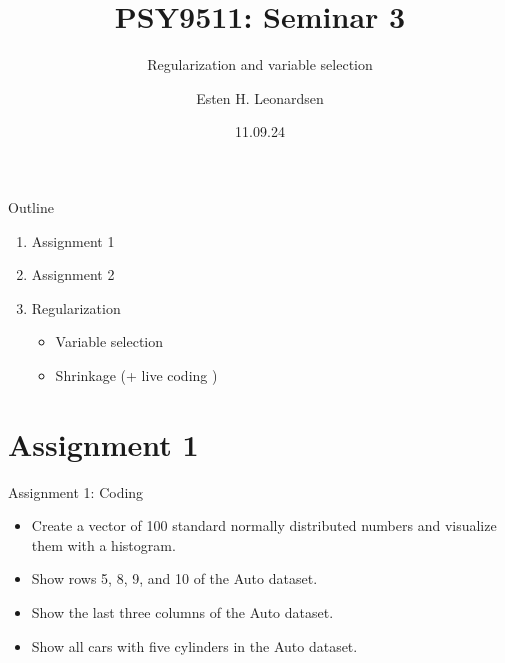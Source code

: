 \documentclass[8pt]{beamer}
\title{PSY9511: Seminar 3}
\subtitle{Regularization and variable selection}
\author{Esten H. Leonardsen}
\date{11.09.24}
\begin{document}
	\begin{frame}
	 	\maketitle
	\end{frame}

    \begin{frame}{Outline}
        \centering
        \vfill
        \begin{enumerate}
            \item Assignment 1
            \item Assignment 2
            \item Regularization
            \begin{itemize}
                \item Variable selection
                \item Shrinkage (+ live coding )
            \end{itemize}
        \end{enumerate}
        \vfill
    \end{frame}

    \section{Assignment 1}

    \begin{frame}[t]{Assignment 1: Coding}
        \vspace{2cm}
        \begin{itemize}
            \item Create a vector of 100 standard normally distributed numbers and visualize them with a histogram.
            \item Show rows 5, 8, 9, and 10 of the Auto dataset.
            \item Show the last three columns of the Auto dataset.
            \item Show all cars with five cylinders in the Auto dataset.
        \end{itemize}

    \end{frame}
\end{document}
